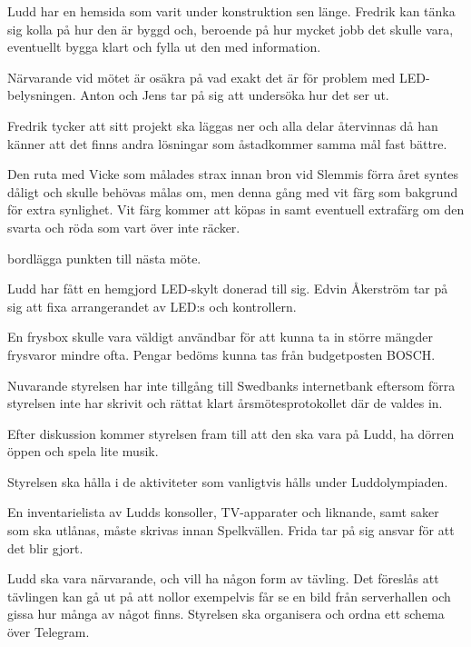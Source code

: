 \documentclass{protokoll}
\begin{document}
Ludd har en hemsida som varit under konstruktion sen länge. Fredrik kan tänka sig kolla på hur den är byggd och, beroende på hur mycket jobb det skulle vara, eventuellt bygga klart och fylla ut den med information.

Närvarande vid mötet är osäkra på vad exakt det är för problem med LED-belysningen. 
Anton och Jens tar på sig att undersöka hur det ser ut. 


Fredrik tycker att sitt projekt ska läggas ner och alla delar återvinnas då han känner att det finns andra lösningar som åstadkommer samma mål fast bättre.

Den ruta med Vicke som målades strax innan bron vid Slemmis förra året syntes dåligt och skulle behövas målas om, men denna gång med vit färg som bakgrund för extra synlighet. 
Vit färg kommer att köpas in samt eventuell extrafärg om den svarta och röda som vart över inte räcker. 

\begin{beslut}
    \att bordlägga punkten till nästa möte.
\end{beslut}

Ludd har fått en hemgjord LED-skylt donerad till sig.  
Edvin Åkerström tar på sig att fixa arrangerandet av LED:s och kontrollern.

En frysbox skulle vara väldigt användbar för att kunna ta in större mängder frysvaror mindre ofta. Pengar bedöms kunna tas från budgetposten BOSCH. 

Nuvarande styrelsen har inte tillgång till Swedbanks internetbank eftersom förra styrelsen inte har skrivit och rättat klart årsmötesprotokollet där de valdes in.

Efter diskussion kommer styrelsen fram till att den ska vara på Ludd, ha dörren öppen och spela lite musik.

Styrelsen ska hålla i de aktiviteter som vanligtvis hålls under Luddolympiaden. 

En inventarielista av Ludds konsoller, TV-apparater och liknande, samt saker som ska utlånas, måste skrivas innan Spelkvällen. 
Frida tar på sig ansvar för att det blir gjort. 

Ludd ska vara närvarande, och vill ha någon form av tävling. Det föreslås att tävlingen kan gå ut på att nollor exempelvis får se en bild från serverhallen och gissa hur många av något finns. 
Styrelsen ska organisera och ordna ett schema över Telegram. 
\end{document}
